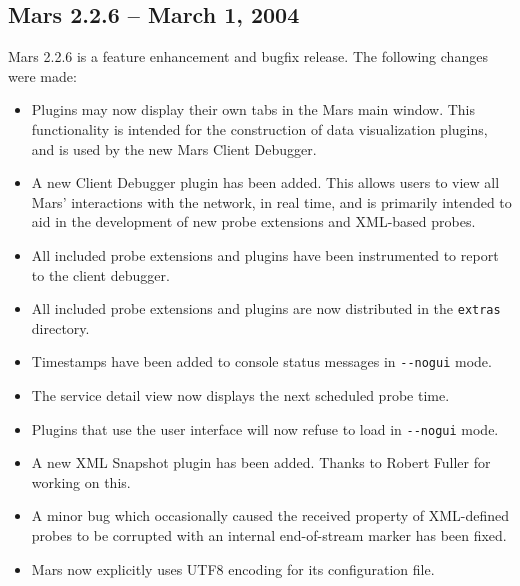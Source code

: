 \documentclass{article}
\newcommand{\filename}[1]{{\tt #1}}
\newcommand{\identifier}[1]{{\tt #1}}
\newcommand{\guiitem}[1]{{\sf #1}}
\begin{document}
\subsection{Mars 2.2.6 -- March 1, 2004}
Mars 2.2.6 is a feature enhancement and bugfix release. The following
changes were made:
\begin{itemize}
\item Plugins may now display their own tabs in the Mars main
  window. This functionality is intended for the construction of data
  visualization plugins, and is used by the new Mars Client Debugger.
\item A new Client Debugger plugin has been added. This allows users
  to view all Mars' interactions with the network, in real time, and
  is primarily intended to aid in the development of new probe
  extensions and XML-based probes.
\item All included probe extensions and plugins have been instrumented
  to report to the client debugger.
\item All included probe extensions and plugins are now distributed in
  the \filename{extras} directory.
\item Timestamps have been added to console status messages in
  \identifier{\mbox{-}\mbox{-}nogui} mode.
\item The service detail view now displays the next scheduled probe time.
\item Plugins that use the user interface will now refuse to load in
  \identifier{\mbox{-}\mbox{-}nogui} mode.
\item A new XML Snapshot plugin has been added. Thanks to Robert
  Fuller for working on this.
\item A minor bug which occasionally caused the \guiitem{received}
  property of XML-defined probes to be corrupted with an internal
  end-of-stream marker has been fixed.
\item Mars now explicitly uses UTF8 encoding for its configuration
  file.
\end{itemize}
\end{document}
